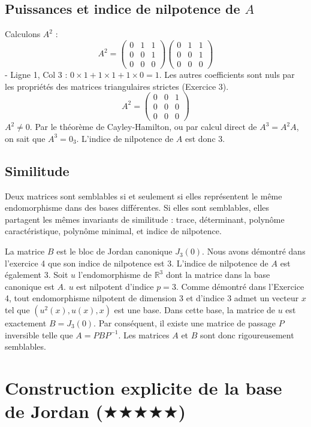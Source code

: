 \documentclass[11pt,a4paper]{article}
\begin{document}
\subsection{Puissances et indice de nilpotence de $A$}
Calculons $A^2$ :
$$A^2 = \begin{pmatrix} 0 & 1 & 1 \\ 0 & 0 & 1 \\ 0 & 0 & 0 \end{pmatrix} \begin{pmatrix} 0 & 1 & 1 \\ 0 & 0 & 1 \\ 0 & 0 & 0 \end{pmatrix}$$
- Ligne 1, Col 3 : $0\times 1 + 1\times 1 + 1\times 0 = 1$.
Les autres coefficients sont nuls par les propriétés des matrices triangulaires strictes (Exercice 3).
$$A^2 = \begin{pmatrix} 0 & 0 & 1 \\ 0 & 0 & 0 \\ 0 & 0 & 0 \end{pmatrix}$$
$A^2 \neq 0$.
Par le théorème de Cayley-Hamilton, ou par calcul direct de $A^3 = A^2 A$, on sait que $A^3 = 0_3$.
L'indice de nilpotence de $A$ est donc $3$.

\subsection{Similitude}
Deux matrices sont semblables si et seulement si elles représentent le même endomorphisme dans des bases différentes. Si elles sont semblables, elles partagent les mêmes invariants de similitude : trace, déterminant, polynôme caractéristique, polynôme minimal, et indice de nilpotence.

La matrice $B$ est le bloc de Jordan canonique $J_3(0)$. Nous avons démontré dans l'exercice 4 que son indice de nilpotence est 3.
L'indice de nilpotence de $A$ est également 3.
Soit $u$ l'endomorphisme de $\mathbb{R}^3$ dont la matrice dans la base canonique est $A$.
$u$ est nilpotent d'indice $p=3$.
Comme démontré dans l'Exercice 4, tout endomorphisme nilpotent de dimension 3 et d'indice 3 admet un vecteur $x$ tel que $(u^2(x), u(x), x)$ est une base. Dans cette base, la matrice de $u$ est exactement $B = J_3(0)$.
Par conséquent, il existe une matrice de passage $P$ inversible telle que $A = P B P^{-1}$.
Les matrices $A$ et $B$ sont donc rigoureusement semblables.


\section{Construction explicite de la base de Jordan ($\bigstar$$\bigstar$$\bigstar$$\bigstar$$\bigstar$)}
\end{document}
